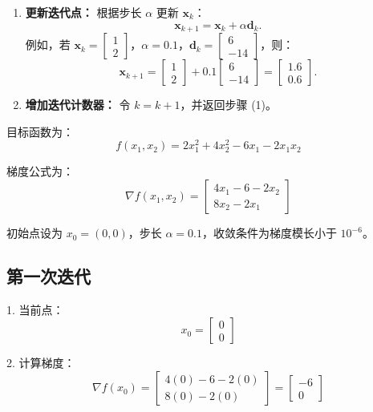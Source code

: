 \documentclass[12pt,a4paper,oneside]{article}
\begin{document}
\begin{enumerate}
    \item \textbf{更新迭代点：}  
    根据步长 \(\alpha\) 更新 \(\mathbf{x}_k\)：
    \[
    \mathbf{x}_{k+1} = \mathbf{x}_k + \alpha \mathbf{d}_k.
    \]
    例如，若 \(\mathbf{x}_k = \begin{bmatrix}1 \\ 2\end{bmatrix}\)，\(\alpha = 0.1\)，\(\mathbf{d}_k = \begin{bmatrix}6 \\ -14\end{bmatrix}\)，则：
    \[
    \mathbf{x}_{k+1} = \begin{bmatrix}1 \\ 2\end{bmatrix} + 0.1 \begin{bmatrix}6 \\ -14\end{bmatrix} = \begin{bmatrix}1.6 \\ 0.6\end{bmatrix}.
    \]

    \item \textbf{增加迭代计数器：}  
    令 \(k = k + 1\)，并返回步骤 (1)。
\end{enumerate}


目标函数为：
\[
f(x_1, x_2) = 2x_1^2 + 4x_2^2 - 6x_1 - 2x_1x_2
\]

梯度公式为：
\[
\nabla f(x_1, x_2) = 
\begin{bmatrix}
4x_1 - 6 - 2x_2 \\
8x_2 - 2x_1
\end{bmatrix}
\]

初始点设为 $x_0 = (0, 0)$，步长 $\alpha = 0.1$，收敛条件为梯度模长小于 $10^{-6}$。

\subsection*{第一次迭代}

1. 当前点：
\[
x_0 = \begin{bmatrix} 0 \\ 0 \end{bmatrix}
\]

2. 计算梯度：
\[
\nabla f(x_0) = 
\begin{bmatrix}
4(0) - 6 - 2(0) \\
8(0) - 2(0)
\end{bmatrix} = 
\begin{bmatrix}
-6 \\
0
\end{bmatrix}
\]
\end{document}
